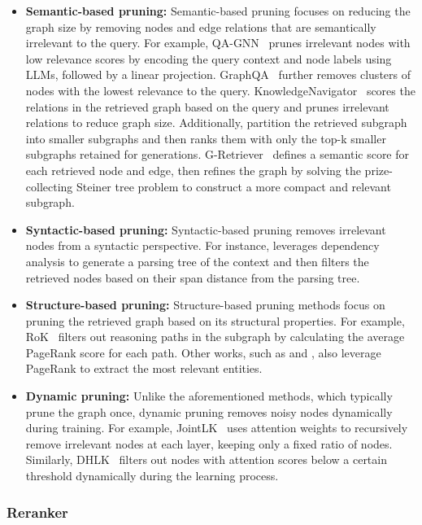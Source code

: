 \begin{itemize}[leftmargin=*]
    \item \textbf{Semantic-based pruning:}  Semantic-based pruning focuses on reducing the graph size by removing nodes and edge relations that are semantically irrelevant to the query. For example, QA-GNN~\cite{yasunaga2021qa} prunes irrelevant nodes with low relevance scores by encoding the query context and node labels using LLMs, followed by a linear projection. GraphQA~\cite{taunk2023grapeqa} further removes clusters of nodes with the lowest relevance to the query. KnowledgeNavigator~\cite{guo2024knowledgenavigator} scores the relations in the retrieved graph based on the query and prunes irrelevant relations to reduce graph size. Additionally, \citet{gao2022graph} partition the retrieved subgraph into smaller subgraphs and then ranks them with only the top-k smaller subgraphs retained for generations. G-Retriever~\cite{he2024g} defines a semantic score for each retrieved node and edge, then refines the graph by solving the prize-collecting Steiner tree problem to construct a more compact and relevant subgraph.
    \item \textbf{Syntactic-based pruning:} Syntactic-based pruning removes irrelevant nodes from a syntactic perspective. For instance, \citet{su2024pipenet} leverages dependency analysis to generate a parsing tree of the context and then filters the retrieved nodes based on their span distance from the parsing tree.
    \item \textbf{Structure-based pruning:} Structure-based pruning methods focus on pruning the retrieved graph based on its structural properties. For example, RoK~\cite{wang2024reasoning} filters out reasoning paths in the subgraph by calculating the average PageRank score for each path. Other works, such as \citet{jiang2023structgpt} and \citet{he2021improving}, also leverage PageRank to extract the most relevant entities.
    \item \textbf{Dynamic pruning:} Unlike the aforementioned methods, which typically prune the graph once, dynamic pruning removes noisy nodes dynamically during training.  For example, JointLK~\cite{sun2021jointlk} uses attention weights to recursively remove irrelevant nodes at each layer, keeping only a fixed ratio of nodes. Similarly, DHLK~\cite{wang2023dynamic} filters out nodes with attention scores below a certain threshold dynamically during the learning process.
\end{itemize}

\subsubsection{Reranker}

